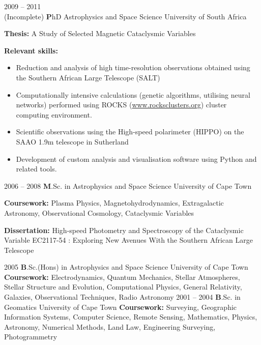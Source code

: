 \documentclass[]{friggeri-cv} %
\begin{document}
\begin{entrylist}
\entry
{2009 -- 2011 \\(Incomplete)}
{\textbf PhD Astrophysics and Space Science}
{University of South Africa}
{{\textbf{Thesis:} A Study of Selected Magnetic Cataclysmic Variables}

{\textbf{Relevant skills:}
    \begin{itemize}
        \item Reduction and analysis of high time-resolution observations obtained using the Southern African Large Telescope (SALT)
        \item Computationally intensive calculations (genetic algorithms, utilising neural networks) performed
        using ROCKS (\url{www.rocksclusters.org}) cluster computing environment.
        \item Scientific observations using the High-speed polarimeter (HIPPO) on the SAAO 1.9m telescope in
        Sutherland
        \item Development of custom analysis and visualisation software using Python and related tools.
\end{itemize}}
}
\entry
{2006 -- 2008}
{\textbf M.Sc. in Astrophysics and Space Science}
{University of Cape Town}
{{\textbf{Coursework:} Plasma Physics, Magnetohydrodynamics, Extragalactic Astronomy, Observational
Cosmology, Cataclysmic Variables}

{\textbf{Dissertation:} High-speed Photometry and Spectroscopy of the Cataclysmic Variable EC2117-54 : Exploring New Avenues With the Southern African Large Telescope }}
\entry
{2005}
{\textbf B.Sc.(Hons) in Astrophysics and Space Science}
{University of Cape Town}
{{\textbf{Coursework:} Electrodynamics, Quantum Mechanics, Stellar Atmospheres, Stellar Structure and Evolution, Computational Physics, General Relativity, Galaxies, Observational Techniques, Radio Astronomy}}
\entry
{2001 -- 2004}
{\textbf B.Sc. in Geomatics}
{University of Cape Town}
{{\textbf{Coursework:} Surveying, Geographic Information Systems, Computer Science, Remote Sensing,
Mathematics, Physics, Astronomy, Numerical Methods, Land Law, Engineering Surveying,
Photogrammetry}}
\end{entrylist}
\end{document}
